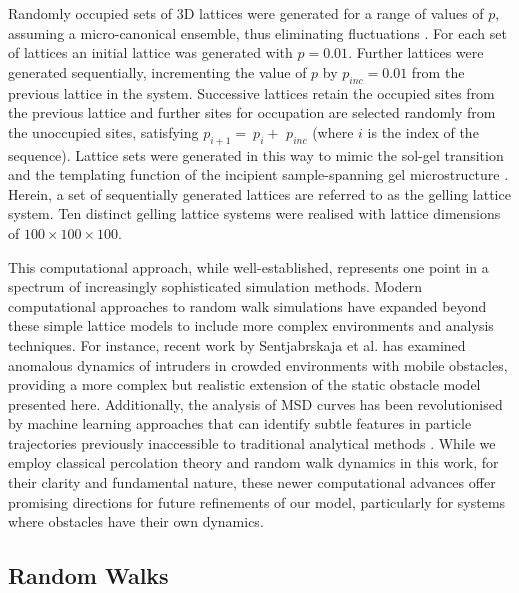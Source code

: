 \documentclass[%
 aip,
 amsmath,amssymb,
reprint, onecolumn %
]{revtex4-1}
\begin{document}
Randomly occupied sets of 3D lattices were generated for a range of values of $p$, assuming a micro-canonical ensemble, thus eliminating fluctuations \cite{Newman2000,Newman2001}. For each set of lattices an initial lattice was generated with $p = 0.01$. Further lattices were generated sequentially, incrementing the value of $p$ by $p_{inc}=0.01$ from the previous lattice in the system. Successive lattices retain the occupied sites from the previous lattice and further sites for occupation are selected randomly from the unoccupied sites, satisfying $p_{i + 1} = \ p_{i} +$ $p_{inc}$ (where $i$ is the index of the sequence). Lattice sets were generated in this way to mimic the sol-gel transition and the templating function of the incipient sample-spanning gel microstructure \cite{Curtis2013}. Herein, a set of sequentially generated lattices are referred to as the gelling lattice system. Ten distinct gelling lattice systems were realised with lattice dimensions of $100\times100\times100$.

This computational approach, while well-established, represents one point in a spectrum of increasingly sophisticated simulation methods. Modern computational approaches to random walk simulations have expanded beyond these simple lattice models to include more complex environments and analysis techniques. For instance, recent work by Sentjabrskaja et al. \cite{Sentjabrskaja2019} has examined anomalous dynamics of intruders in crowded environments with mobile obstacles, providing a more complex but realistic extension of the static obstacle model presented here. Additionally, the analysis of MSD curves has been revolutionised by machine learning approaches that can identify subtle features in particle trajectories previously inaccessible to traditional analytical methods \cite{Li2020}. While we employ classical percolation theory and random walk dynamics in this work, for their clarity and fundamental nature, these newer computational advances offer promising directions for future refinements of our model, particularly for systems where obstacles have their own dynamics.

\subsection{Random Walks}
\end{document}

